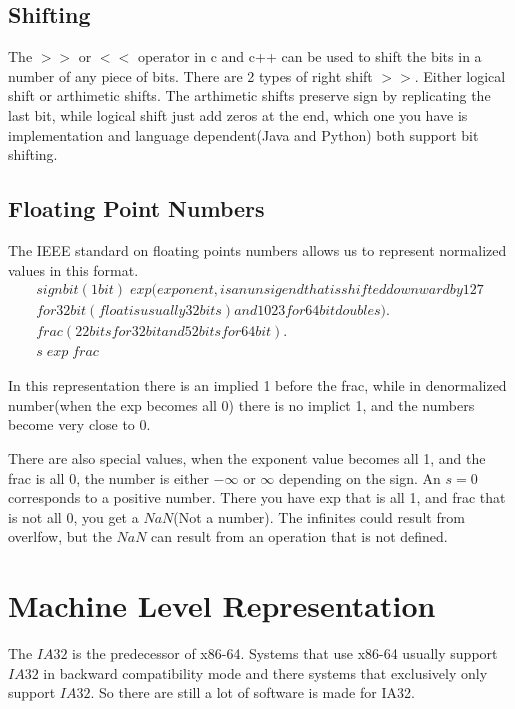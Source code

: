 \documentclass{article}
\begin{document}
\subsection{Shifting}

The $>>$ or $<<$ operator in c and c++ can be used to shift the bits in a number of any piece of bits. There are 2 types of right shift $>>$. Either logical shift or arthimetic shifts.
The arthimetic shifts preserve sign by replicating the last bit, while logical shift just add zeros at the end, which one you have is implementation and language dependent(Java and Python) 
both support bit shifting.

\subsection{Floating Point Numbers}

The IEEE standard on floating points numbers allows us to represent normalized values in this format.
\begin{align*}
  signbit(1bit) \; exp(exponent, is an unsigend that is shifted down ward by 127 \\for 32 bit(float is usually 32 bits) and 1023 for 64 bit doubles). \;\\ frac (22 bits for 32 bit and 52 bits for 64 bit).\\
  s \; exp \; frac
\end{align*}

In this representation there is an implied 1 before the frac, while in denormalized number(when the exp becomes all 0) there is no implict 1, and the numbers become very close to 0.

There are also special values, when the exponent value becomes all 1, and the frac is all 0, the number is either $-\infty$ or $\infty$ depending on the sign. An $s=0$ corresponds to a 
positive number. There you have exp that is all 1, and frac that is not all 0, you get a $NaN$(Not a number). The infinites could result from overlfow, but the $NaN$ can result from 
an operation that is not defined.

\section{Machine Level Representation}

The $IA32$ is the predecessor of x86-64. Systems that use x86-64 usually support $IA32$ in backward compatibility mode and there systems that exclusively only support $IA32$.
So there are still a lot of software is made for IA32. 
\end{document}
